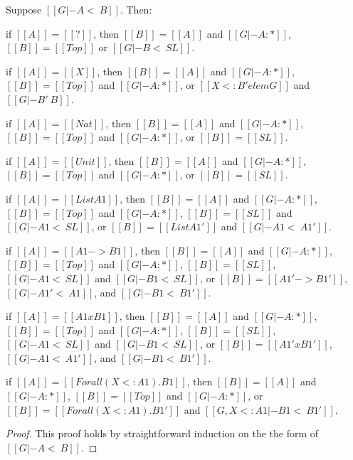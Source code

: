 \begin{lemma}
  \label{lemma:inversion_of_consistent_subtyping}
  Suppose $[[G |- A <~ B]]$. Then:
  \begin{enumR}
  \item if $[[A]] = [[?]]$, then
    $[[B]] = [[A]]$ and $[[G |- A : *]]$, $[[B]] = [[Top]]$ or $[[G |- B <~ SL]]$.
  \item if $[[A]] = [[X]]$, then
    $[[B]] = [[A]]$ and $[[G |- A : *]]$, $[[B]] = [[Top]]$ and $[[G |- A : *]]$, or $[[X <: B' elem G]]$ and $[[G |- B' ~ B]]$.
  \item if $[[A]] = [[Nat]]$, then
    $[[B]] = [[A]]$ and $[[G |- A : *]]$, $[[B]] = [[Top]]$ and $[[G |- A : *]]$, or $[[B]] = [[SL]]$.
  \item if $[[A]] = [[Unit]]$, then
    $[[B]] = [[A]]$ and $[[G |- A : *]]$, $[[B]] = [[Top]]$ and $[[G |- A : *]]$, or $[[B]] = [[SL]]$.
  \item if $[[A]] = [[List A1]]$, then
    $[[B]] = [[A]]$ and $[[G |- A : *]]$, $[[B]] = [[Top]]$ and $[[G |- A : *]]$, $[[B]] = [[SL]]$ and $[[G |- A1 <~ SL]]$,
    or $[[B]] = [[List A1']]$ and $[[G |- A1 <~ A1']]$.
  \item if $[[A]] = [[A1 -> B1]]$, then
    $[[B]] = [[A]]$ and $[[G |- A : *]]$, $[[B]] = [[Top]]$ and $[[G |- A : *]]$, $[[B]] = [[SL]]$, $[[G |- A1 <~ SL]]$ and
    $[[G |- B1 <~ SL]]$, or $[[B]] = [[A1' -> B1']]$, $[[G |- A1' <~ A1]]$, and $[[G |- B1 <~ B1']]$.
  \item if $[[A]] = [[A1 x B1]]$, then
    $[[B]] = [[A]]$ and $[[G |- A : *]]$, $[[B]] = [[Top]]$ and $[[G |- A : *]]$, $[[B]] = [[SL]]$, $[[G |- A1 <~ SL]]$ and
    $[[G |- B1 <~ SL]]$, or $[[B]] = [[A1' x B1']]$, $[[G |- A1 <~ A1']]$, and $[[G |- B1 <~ B1']]$.
  \item if $[[A]] = [[Forall (X <: A1).B1]]$, then
    $[[B]] = [[A]]$ and $[[G |- A : *]]$, $[[B]] = [[Top]]$ and $[[G |- A : *]]$,
    or $[[B]] = [[Forall (X <: A1).B1']]$ and $[[G, X <: A1 |- B1 <~ B1']]$.
  \end{enumR}
\end{lemma}
\begin{proof}
  This proof holds by straightforward induction on the the form of $[[G |- A <~ B]]$.
\end{proof}

